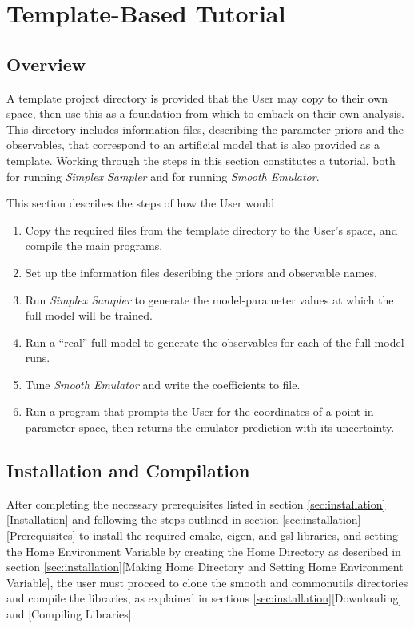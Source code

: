 \documentclass[UserManual.tex]{subfiles}
\begin{document}
\setcounter{section}{7}
\section{Template-Based Tutorial}\label{sec:tutorial}

\subsection{Overview}
A template project directory is provided that the User may copy to their own space, then use this as a foundation from which to embark on their own analysis. This directory includes information files, describing the parameter priors and the observables, that correspond to an artificial model that is also provided as a template. Working through the steps in this section constitutes a tutorial, both for running {\it Simplex Sampler} and for running {\it Smooth Emulator}.

This section describes the steps of how the User would
\begin{enumerate}\itemsep=0pt
\item Copy the required files from the template directory to the User's space, and compile the main programs.
\item Set up the information files describing the priors and observable names.
\item Run {\it Simplex Sampler} to generate the model-parameter values at which the full model will be trained.
\item Run a ``real'' full model to generate the observables for each of the full-model runs.
\item Tune {\it Smooth Emulator} and write the coefficients to file.
\item Run a program that prompts the User for the coordinates of a point in parameter space, then returns the emulator prediction with its uncertainty.
\end{enumerate}

\subsection{Installation and Compilation}
After completing the necessary prerequisites listed in section \ref{sec:installation}[Installation] and following the steps outlined in section \ref{sec:installation}[Prerequisites] to install the required cmake, eigen, and gsl libraries, and setting the Home Environment Variable by creating the Home Directory as described in section \ref{sec:installation}[Making Home Directory and Setting Home Environment Variable], the user must proceed to clone the smooth and commonutils directories and compile the libraries, as explained in sections \ref{sec:installation}[Downloading] and [Compiling Libraries].
\end{document}
